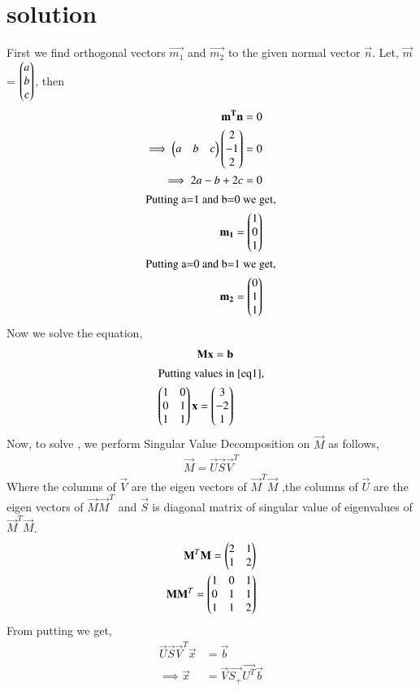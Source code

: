 \documentclass[journal,12pt,twocolumn]{IEEEtran}
\begin{document}
 \section{solution}
First we find orthogonal vectors $\vec{m_1}$ and $\vec{m_2}$ to the given normal vector $\vec{n}$. Let, $\vec{m}$ = $\begin{pmatrix}a\\b\\c\end{pmatrix}$, then
\begin{align}
\mathbf{m^T}\mathbf{n} = 0\\
\implies\begin{pmatrix}a&b&c\end{pmatrix}\begin{pmatrix}2\\-1\\2\end{pmatrix} = 0\\
\implies2a-b+2c = 0\\
\intertext{Putting a=1 and b=0 we get,}
\mathbf{m_1} = \begin{pmatrix}1\\0\\1\end{pmatrix}\\
\intertext{Putting a=0 and b=1 we get,}
\mathbf{m_2} = \begin{pmatrix}0\\1\\1\end{pmatrix}
\end{align}
Now we solve the equation,
\begin{align}
\vec{M}\vec{x} = \vec{b}\label{eq1}\\
\intertext{Putting values in \refeq{eq1},}
\myvec{1&0\\0&1\\1&1}\vec{x} = \myvec{3\\-2\\1} \label{eq2}
\end{align}
Now, to solve , we perform Singular Value Decomposition on $\vec{M}$ as follows,
\begin{align}
\vec{M}=\vec{U}\vec{S}\vec{V}^T\label{eqSVD}
\end{align}
Where the columns of $\vec{V}$ are the eigen vectors of $\vec{M}^T\vec{M}$ ,the columns of $\vec{U}$ are the eigen vectors of $\vec{M}\vec{M}^T$ and $\vec{S}$ is diagonal matrix of singular value of eigenvalues of $\vec{M}^T\vec{M}$.
\begin{align}
\mathbf{M}^T\mathbf{M}=\begin{pmatrix}2&1\\1&2\end{pmatrix}\label{eqMTM}\\
\mathbf{M}\mathbf{M}^T=\begin{pmatrix}1&0&1\\0&1&1\\1&1&2\end{pmatrix}
\end{align}
From  putting  we get,
\begin{align}
\vec{U}\vec{S}\vec{V}^T\vec{x} & = \vec{b}\\
\implies\vec{x} &= \vec{V}\vec{S_+}\vec{U^T}\vec{b}\label{eqX}
\end{align}
\end{document}
